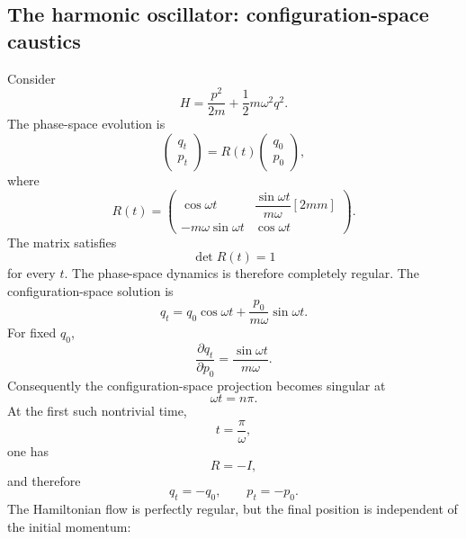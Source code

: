 \subsection{The harmonic oscillator: configuration-space caustics}
Consider
\begin{equation}
H=\frac{p^2}{2m}
+\frac12m\omega^2q^2.
\end{equation}
The phase-space evolution is
\begin{equation}
\begin{pmatrix}
q_t\\p_t
\end{pmatrix}=R(t)
\begin{pmatrix}
q_0\\p_0
\end{pmatrix},
\end{equation}
where
\begin{equation}
R(t)=
\begin{pmatrix}
\cos\omega t&
\dfrac{\sin\omega t}{m\omega}[2mm]\\
-m\omega\sin\omega t&
\cos\omega t
\end{pmatrix}.
\label{oscillatorR}
\end{equation}
The matrix satisfies
\begin{equation}
\det R(t)=1
\end{equation}
for every \(t\).  The phase-space dynamics is therefore completely regular.
The configuration-space solution is
\begin{equation}
q_t=q_0\cos\omega t
+\frac{p_0}{m\omega}\sin\omega t.
\end{equation}
For fixed \(q_0\),
\begin{equation}
\frac{\partial q_t}{\partial p_0}=\frac{\sin\omega t}{m\omega}.
\end{equation}
Consequently the configuration-space projection becomes singular at
\begin{equation}
\omega t=n\pi.
\label{oscconfigcaustic}
\end{equation}
At the first such nontrivial time,
\begin{equation}
t=\frac{\pi}{\omega},
\end{equation}
one has
\begin{equation}
R=-I,
\end{equation}
and therefore
\begin{equation}
q_t=-q_0,\qquad p_t=-p_0.
\end{equation}
The Hamiltonian flow is perfectly regular, but the final position is
independent of the initial momentum:
